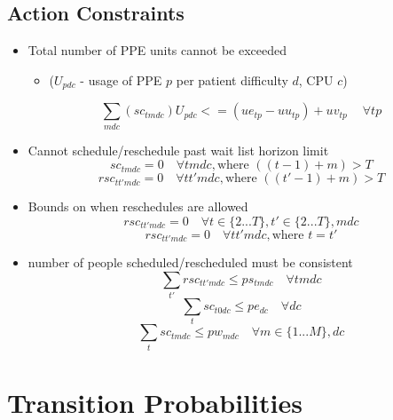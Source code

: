 \documentclass{article}
\begin{document}
\subsection{Action Constraints}
\begin{itemize}
    \item Total number of PPE units cannot be exceeded  
    \begin{itemize}
    	\item ($U_{pdc}$ - usage of PPE $p$ per patient difficulty $d$, CPU $c$)
    \end{itemize}
        \[ \sum_{mdc}(sc_{tmdc})U_{pdc} <= (ue_{tp} - uu_{tp}) + uv_{tp}\ \quad \forall tp \]
	\item Cannot schedule/reschedule past wait list horizon limit
		\[ sc_{tmdc} = 0 \quad \forall tmdc, \text{where } ((t-1)+m) > T \]
		\[ rsc_{tt'mdc} = 0 \quad \forall tt'mdc, \text{where } ((t'-1)+m) > T \]
	\item Bounds on when reschedules are allowed
		\[ rsc_{tt'mdc} = 0 \quad \forall t \in \{ 2...T \}, t' \in \{ 2...T \}, mdc \]
		\[ rsc_{tt'mdc} = 0 \quad \forall tt'mdc, \text{where } t=t' \]
	
	\item number of people scheduled/rescheduled must be consistent
		\[ \sum_{t'} rsc_{tt'mdc} \le ps_{tmdc} \quad \forall tmdc \]
		\[ \sum_{t} sc_{t0dc} \le pe_{dc} \quad \forall dc \]
		\[ \sum_{t} sc_{tmdc} \le pw_{mdc} \quad \forall m \in \{1...M \}, dc \]
\end{itemize}

\section{Transition Probabilities}
\end{document}
